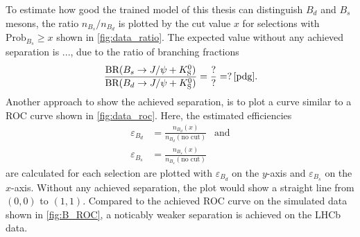 To estimate how good the trained model of this thesis can distinguish $B_d$ and $B_s$ mesons, the ratio $n_{B_s}/n_{B_d}$ is plotted by the cut value $x$ for selections with $\text{Prob}_{B_s} \geq x$ shown in \autoref{fig:data_ratio}.
The expected value without any achieved separation is ..., due to the ratio of branching fractions
\begin{equation*}
    \frac{\text{BR}(B_s \rightarrow J/\psi + K^0_\text{S})}{\text{BR}(B_d \rightarrow J/\psi + K^0_\text{S})} =
    \frac{?}{?} = ? \, \text{\cite{pdg}.}
\end{equation*}
Another approach to show the achieved separation, is to plot a curve similar to a ROC curve shown in \autoref{fig:data_roc}.
Here, the estimated efficiencies
\begin{align*}
    \varepsilon_{B_d} &= \frac{n_{B_d}(x)}{n_{B_d}(\text{no cut})} \: \: \text{ and} \\
    \varepsilon_{B_s} &= \frac{n_{B_s}(x)}{n_{B_s}(\text{no cut})}
\end{align*}
are calculated for each selection are plotted with $\varepsilon_{B_d}$ on the $y$-axis and $\varepsilon_{B_s}$ on the $x$-axis.
Without any achieved separation, the plot would show a straight line from $(0,0)$ to $(1,1)$.
Compared to the achieved ROC curve on the simulated data shown in \autoref{fig:B_ROC}, a noticably weaker separation is achieved on the LHCb data.

